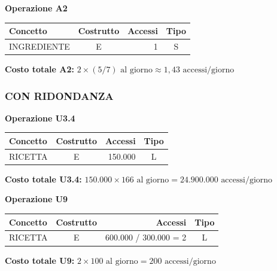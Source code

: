 \vspace{1.5em}

\noindent\textbf{Operazione A2}
\begin{table}[H]
\centering
\renewcommand{\arraystretch}{1.2}
\setlength{\tabcolsep}{8pt}
\begin{tabularx}{\textwidth}{|X|c|r|c|}
\hline
\textbf{Concetto} & \textbf{Costrutto} & \textbf{Accessi} & \textbf{Tipo} \\
\hline
INGREDIENTE & E & 1 & S \\
\hline
\end{tabularx}
\end{table}
\textbf{Costo totale A2:} $2 \times (5 / 7) \mbox{ al giorno} \approx 1,43 \mbox{ accessi/giorno}$

\vspace{2em}

\subsubsection*{CON RIDONDANZA}

\noindent\textbf{Operazione U3.4}
\begin{table}[H]
\centering
\renewcommand{\arraystretch}{1.2}
\setlength{\tabcolsep}{8pt}
\begin{tabularx}{\textwidth}{|X|c|r|c|}
\hline
\textbf{Concetto} & \textbf{Costrutto} & \textbf{Accessi} & \textbf{Tipo} \\
\hline
RICETTA & E & 150.000 & L \\
\hline
\end{tabularx}
\end{table}
\textbf{Costo totale U3.4:} $150.000 \times 166 \mbox{ al giorno} = 24.900.000 \mbox{ accessi/giorno}$

\vspace{1.5em}

\noindent\textbf{Operazione U9}
\begin{table}[H]
\centering
\renewcommand{\arraystretch}{1.2}
\setlength{\tabcolsep}{8pt}
\begin{tabularx}{\textwidth}{|X|c|r|c|}
\hline
\textbf{Concetto} & \textbf{Costrutto} & \textbf{Accessi} & \textbf{Tipo} \\
\hline
RICETTA & E & 600.000 / 300.000 = 2 & L \\
\hline
\end{tabularx}
\end{table}
\textbf{Costo totale U9:} $2 \times 100 \mbox{ al giorno} = 200 \mbox{ accessi/giorno}$

